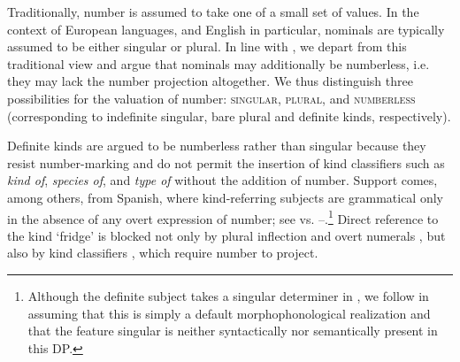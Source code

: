 \documentclass[output=paper,
colorlinks,
citecolor=brown,
newtxmath
]{langscibook}
\begin{document}
Traditionally, number is assumed to take one of a small set of values. In the context of European languages, and English in particular, nominals are typically assumed to be either singular or plural. In line with \citet{Borik.Espinal2012, Borik.Espinal2015}, we depart from this traditional view and argue that nominals may additionally be numberless, i.e. they may lack the number projection altogether. We thus distinguish three possibilities for the valuation of number: \textsc{singular}, \textsc{plural}, and \textsc{numberless} (corresponding to indefinite singular, bare plural and definite kinds, respectively).

Definite kinds are argued to be numberless rather than singular because they resist number-marking and do not permit the insertion of kind classifiers such as \textit{kind of}, \textit{species of}, and \textit{type of} without the addition of number. Support comes, among others, from Spanish, where kind-referring subjects are grammatical only in the absence of any overt expression of number; see  vs. --.\footnote{Although the definite subject takes a singular determiner in , we follow \citeauthor{Borik.Espinal2012} in assuming that this is simply a default morphophonological realization and that the feature singular is neither syntactically nor semantically present in this DP.}
Direct reference to the kind `fridge' is blocked not only by plural inflection and overt numerals , but also by kind classifiers , which require number to project.

\ea \label{ex:nevera}
\label{ex:neveradefsg}


\z \z
\end{document}
